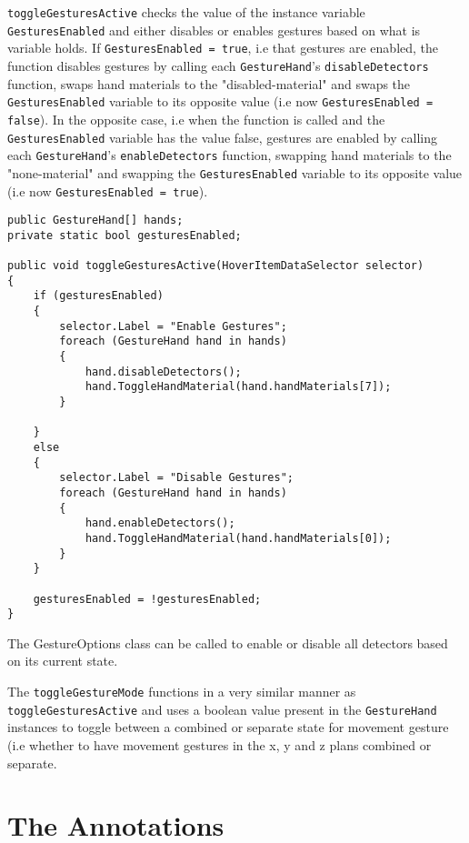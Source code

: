 \texttt{toggleGesturesActive} checks the value of the instance variable \texttt{GesturesEnabled} 
and either disables or enables gestures based on what is variable holds. If \texttt{GesturesEnabled = true}, i.e that gestures are enabled, the function 
disables gestures by calling each \texttt{GestureHand}'s \texttt{disableDetectors} function, swaps hand materials to the "disabled-material" and swaps the 
\texttt{GesturesEnabled} variable to its opposite value (i.e now \texttt{GesturesEnabled = false}). In the opposite case, i.e when the function is called and 
the \texttt{GesturesEnabled} variable has the value false, gestures are enabled by calling each \texttt{GestureHand}'s \texttt{enableDetectors} function, swapping
hand materials to the "none-material" and swapping the \texttt{GesturesEnabled} variable to its opposite value (i.e now \texttt{GesturesEnabled = true}). 

\begin{table}
\label{table:gesture_options_code}
\lstset{style=csharp}
\begin{lstlisting}
public GestureHand[] hands;
private static bool gesturesEnabled;

public void toggleGesturesActive(HoverItemDataSelector selector)
{
	if (gesturesEnabled)
	{
		selector.Label = "Enable Gestures";
		foreach (GestureHand hand in hands)
		{
			hand.disableDetectors();
			hand.ToggleHandMaterial(hand.handMaterials[7]);
		}

	}
	else
	{
		selector.Label = "Disable Gestures";
		foreach (GestureHand hand in hands)
		{
			hand.enableDetectors();
			hand.ToggleHandMaterial(hand.handMaterials[0]);
		}
	}

	gesturesEnabled = !gesturesEnabled;
}
\end{lstlisting}
\caption[The GestureOptions class]{The GestureOptions class can be called to enable or disable all detectors based on its current state.} 
\end{table}

The \texttt{toggleGestureMode} functions in a very similar manner as \texttt{toggleGesturesActive} and uses a boolean value present in the \texttt{GestureHand} instances
to toggle between a combined or separate state for movement gesture (i.e whether to have movement gestures in the x, y and z plans combined or separate.   

\section{The Annotations}


